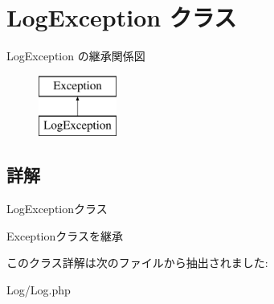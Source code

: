 \hypertarget{class_log_exception}{\section{Log\+Exception クラス}
\label{class_log_exception}
}
Log\+Exception の継承関係図\begin{figure}[H]
\begin{center}
\leavevmode
\includegraphics[height=2.000000cm]{class_log_exception}
\end{center}
\end{figure}


\subsection{詳解}
Log\+Exceptionクラス

Exceptionクラスを継承 

このクラス詳解は次のファイルから抽出されました\+:\begin{DoxyCompactItemize}
\item 
Log/Log.\+php\end{DoxyCompactItemize}
